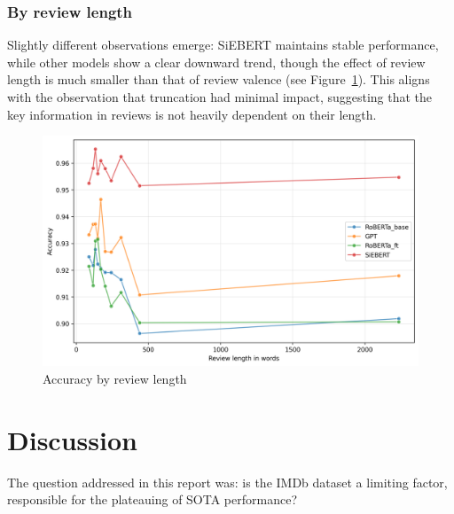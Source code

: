 \documentclass{article}
\begin{document}
\subsubsection{By review length}

Slightly different observations emerge: SiEBERT maintains stable performance, while other models show a clear downward trend, though the effect of review length is much smaller than that of review valence (see Figure~\ref{fig:accuracy-length}). This aligns with the observation that truncation had minimal impact, suggesting that the key information in reviews is not heavily dependent on their length.

\begin{figure}
  \centering
  \includegraphics[width=\textwidth]{figures/accuracy_vs_wordcount.png}
  \caption{Accuracy by review length}
  \label{fig:accuracy-length}
\end{figure}

\section{Discussion}

The question addressed in this report was: is the IMDb dataset a limiting factor, responsible for the plateauing of SOTA performance?
\end{document}
